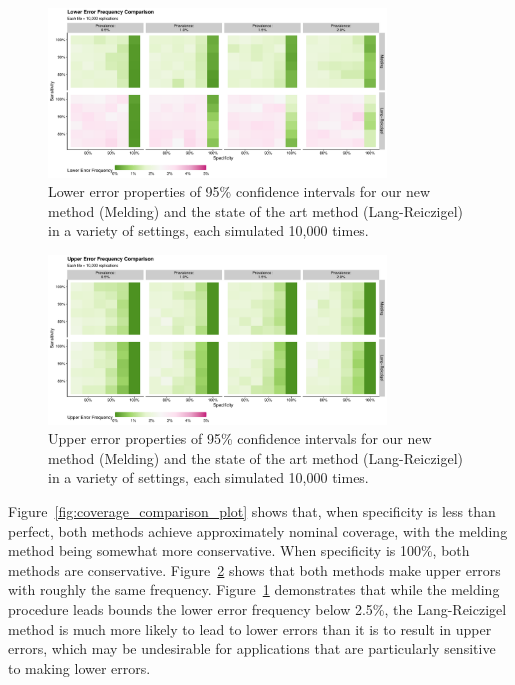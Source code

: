 \documentclass[AMA,STIX1COL]{WileyNJD-v2}
\begin{document}
\begin{figure}
    \centering
    \includegraphics[width=0.8\textwidth]{figures/simple_lower_error_frequency_comparison_plot.pdf}
    \caption{Lower error properties of 95\% confidence intervals for our new method (Melding) and the state of the art method (Lang-Reiczigel) in a variety of settings, each simulated 10,000 times.}
    \label{fig:lower_error_frequency_comparison_plot}
\end{figure}

\begin{figure}
    \centering
    \includegraphics[width=0.8\textwidth]{figures/simple_upper_error_frequency_comparison_plot.pdf}
    \caption{Upper error properties of 95\% confidence intervals for our new method (Melding) and the state of the art method (Lang-Reiczigel) in a variety of settings, each simulated 10,000 times.}
    \label{fig:upper_error_frequency_comparison_plot}
\end{figure}

Figure~\ref{fig:coverage_comparison_plot} shows that, when specificity is less than perfect, both methods achieve approximately nominal coverage, with the melding method being somewhat more conservative.
When specificity is 100\%, both methods are conservative.
Figure~\ref{fig:upper_error_frequency_comparison_plot} shows that both methods make upper errors with roughly the same frequency.
Figure~\ref{fig:lower_error_frequency_comparison_plot} demonstrates that while the melding procedure leads bounds the lower error frequency below 2.5\%, the Lang-Reiczigel method is much more likely to lead to lower errors than it is to result in upper errors, which may be undesirable for applications that are particularly sensitive to making lower errors.
\end{document}
